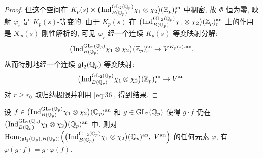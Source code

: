\begin{proof}
但这个空间在 $K_p(s) \times \bigl(\prescript{}{}{\mathrm{Ind}}_{B(\mathbb{Q}_p)}^{\mathrm{GL}_2(\mathbb{Q}_p)} \chi_1 \otimes \chi_2\bigr)(\mathbb{Z}_p)^{\mathrm{an}}_{r}$ 中稠密, 故 $\Phi$ 恒为零, 映射 $\varphi_r$ 是 $K_p(s)$-等变的.
由于 $K_p(s)$ 在 $\bigl(\prescript{}{}{\mathrm{Ind}}_{B(\mathbb{Q}_p)}^{\mathrm{GL}_2(\mathbb{Q}_p)} \chi_1 \otimes \chi_2\bigr)(\mathbb{Z}_p)^{\mathrm{an}}_{r}$ 上的作用是 $\mathcal{K}_p(s)$-刚性解析的, 可见 $\varphi_r$ 经一个连续 $K_p(s)$-等变映射分解:
\[
\bigl(\prescript{}{}{\mathrm{Ind}}_{B(\mathbb{Q}_p)}^{\mathrm{GL}_2(\mathbb{Q}_p)} \chi_1 \otimes \chi_2\bigr)(\mathbb{Z}_p)^{\mathrm{an}}_{r} \to V^{K_p(s)\text{-an}},
\]
从而特别地经一个连续 $\mathfrak{gl}_2(\mathbb{Q}_p)$-等变映射:
\[
\bigl(\prescript{}{}{\mathrm{Ind}}_{B(\mathbb{Q}_p)}^{\mathrm{GL}_2(\mathbb{Q}_p)} \chi_1 \otimes \chi_2\bigr)(\mathbb{Z}_p)^{\mathrm{an}}_{r} \to V^{\mathrm{an}}.
\]
对 $r \ge r_0$ 取归纳极限并利用 \eqref{eq:36}, 得到结果.
\end{proof}

\begin{lemma}\label{lem:A.2.3}
设 $f \in \bigl(\prescript{}{}{\mathrm{Ind}}_{B(\mathbb{Q}_p)}^{\mathrm{GL}_2(\mathbb{Q}_p)} \chi_1 \otimes \chi_2\bigr)(\mathbb{Q}_p)^{\mathrm{an}}$ 和 $g \in \mathrm{GL}_2(\mathbb{Q}_p)$ 使得 $g \cdot f$ 仍在 $\bigl(\prescript{}{}{\mathrm{Ind}}_{B(\mathbb{Q}_p)}^{\mathrm{GL}_2(\mathbb{Q}_p)} \chi_1 \otimes \chi_2\bigr)(\mathbb{Q}_p)^{\mathrm{an}}$ 中, 则对 $\Hom_{(\mathfrak{gl}_2(\Qp),B(\Qp))}\Bigl(\bigl(\pind{}_{B(\Qp)}^{\GL_2(\Qp)} \chi_1 \otimes \chi_2\bigr)(\Qp)^{\mathrm{an}},\ V^{\mathrm{an}}\Bigr)$ 的任何元素 $\varphi$, 有 $\varphi(g \cdot f) = g \cdot \varphi(f)$.
\end{lemma}

